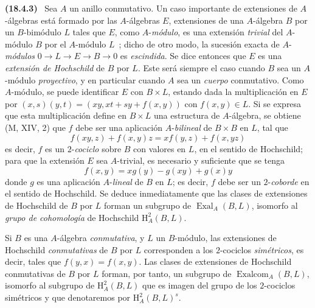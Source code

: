 \documentclass[10pt,oneside]{book}
\makeatletter
\newcommand{\setmanualcurrentlabel}[1]{\def\@currentlabel{#1}}
\newenvironment{env}[1][]{\setmanualcurrentlabel{#1}\par\medskip\noindent\textbf{(#1)}\ }{\par}
\makeatother
\begin{document}
\begin{env}[18.4.3]
\label{0.18.4.3-es}
Sea $A$ un anillo conmutativo. Un caso importante de extensiones de
$A$-álgebras está formado por las $A$-álgebras $E$, extensiones de una $A$-álgebra $B$
por un $B$-bimódulo $L$ tales que $E$, como $A$-\emph{módulo}, es una
extensión \emph{trivial} del $A$-módulo $B$ por el $A$-módulo $L$~; dicho de otro
modo, la sucesión exacta de $A$-\emph{módulos}
$0\to L\to E\to B\to0$ es \emph{escindida}. Se dice entonces que $E$ es una
\emph{extensión de Hochschild} de $B$ por $L$. Este será siempre el caso cuando
$B$ sea un $A$-módulo \emph{proyectivo}, y en particular cuando $A$ sea un
\emph{cuerpo} conmutativo. Como $A$-módulo, se puede identificar $E$ con
$B\times L$, estando dada la multiplicación en $E$ por
$(x,s)(y,t)=(xy,xt+sy+f(x,y))$ con $f(x,y)\in L$. Si se expresa que esta
multiplicación define en $B\times L$ una estructura de $A$-álgebra, se obtiene
(M, XIV, 2) que $f$ debe ser una aplicación $A$-\emph{bilineal} de
$B\times B$ en $L$, tal que
\begin{equation}
\label{0.18.4.3.1-es}
\tag{18.4.3.1}
  f(xy,z)+f(x,y)z=xf(y,z)+f(x,yz)
\end{equation}
es decir, $f$ es un $2$-\emph{cociclo} sobre $B$ con valores en $L$, en el
sentido de Hochschild; para que la extensión $E$ sea $A$-trivial, es necesario
y suficiente que se tenga
\begin{equation}
\label{0.18.4.3.2-es}
\tag{18.4.3.2}
  f(x,y)=xg(y)-g(xy)+g(x)y
\end{equation}
donde $g$ es una aplicación $A$-\emph{lineal} de $B$ en $L$; es decir, $f$
debe ser un $2$-\emph{coborde} en el sentido de Hochschild. Se deduce
inmediatamente que las clases de extensiones de Hochschild de $B$ por $L$
forman un subgrupo de $\operatorname{Exal}_A(B,L)$, isomorfo al \emph{grupo de
cohomología} de Hochschild $\mathrm H_A^2(B,L)$.

Si $B$ es una $A$-álgebra \emph{conmutativa}, y $L$ un $B$-módulo, las
extensiones de Hochschild \emph{conmutativas} de $B$ por $L$ corresponden a los
$2$-cociclos \emph{simétricos}, es decir, tales que $f(y,x)=f(x,y)$. Las clases
de extensiones de Hochschild conmutativas de $B$ por $L$ forman, por tanto, un
subgrupo de $\operatorname{Exalcom}_A(B,L)$, isomorfo al subgrupo de
$\mathrm H_A^2(B,L)$ que es imagen del grupo de los $2$-cociclos simétricos y
que denotaremos por $\mathrm H_A^2(B,L)^s$.
\end{env}
\end{document}
